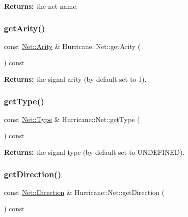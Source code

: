 {\bfseries Returns\+:} the net name. \mbox{\label{classHurricane_1_1Net_a78de2202fcf4f16024b4460ebb7dc907}} 
\subsubsection{\texorpdfstring{get\+Arity()}{getArity()}}
{\footnotesize\ttfamily const \mbox{\hyperlink{classHurricane_1_1Net_a3a242d929e0c733f90f3f69be8cc427b}{Net\+::\+Arity}} \& Hurricane\+::\+Net\+::get\+Arity (\begin{DoxyParamCaption}{ }\end{DoxyParamCaption}) const\hspace{0.3cm}{\ttfamily [inline]}}

{\bfseries Returns\+:} the signal arity (by default set to 1). \mbox{\label{classHurricane_1_1Net_a0fa61dc0ccb67f384f03b35f83d391e7}} 
\subsubsection{\texorpdfstring{get\+Type()}{getType()}}
{\footnotesize\ttfamily const \mbox{\hyperlink{classHurricane_1_1Net_1_1Type}{Net\+::\+Type}} \& Hurricane\+::\+Net\+::get\+Type (\begin{DoxyParamCaption}{ }\end{DoxyParamCaption}) const\hspace{0.3cm}{\ttfamily [inline]}}

{\bfseries Returns\+:} the signal type (by default set to U\+N\+D\+E\+F\+I\+N\+ED). \mbox{\label{classHurricane_1_1Net_aa84245d734dfaa572660a1a2c1bfc56e}} 
\subsubsection{\texorpdfstring{get\+Direction()}{getDirection()}}
{\footnotesize\ttfamily const \mbox{\hyperlink{classHurricane_1_1Net_1_1Direction}{Net\+::\+Direction}} \& Hurricane\+::\+Net\+::get\+Direction (\begin{DoxyParamCaption}{ }\end{DoxyParamCaption}) const\hspace{0.3cm}{\ttfamily [inline]}}

